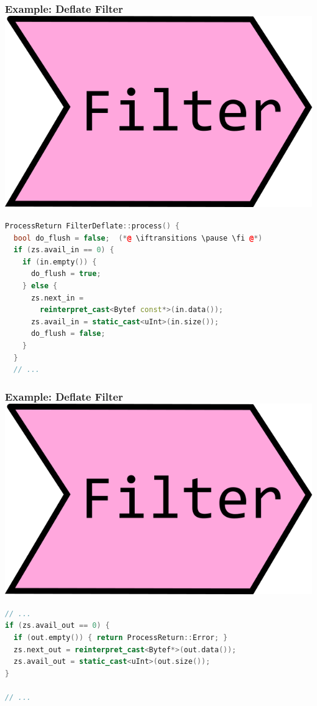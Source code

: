 \documentclass[aspectratio=169]{beamer}
\newif\iftransitions
\begin{document}
\begin{frame}[fragile]
  \frametitle{Example: Deflate Filter \hspace{233pt} \includegraphics[height=.1\textheight]{pipelinesgfx/filter.png}}
  
  \begin{lstlisting}[language={C++}]
ProcessReturn FilterDeflate::process() {
  bool do_flush = false;  (*@ \iftransitions \pause \fi @*)
  if (zs.avail_in == 0) {
    if (in.empty()) {
      do_flush = true;
    } else {
      zs.next_in =
        reinterpret_cast<Bytef const*>(in.data());
      zs.avail_in = static_cast<uInt>(in.size());
      do_flush = false;
    }
  }
  // ...
  \end{lstlisting}
\end{frame}

\begin{frame}[fragile]
  \frametitle{Example: Deflate Filter \hspace{233pt} \includegraphics[height=.1\textheight]{pipelinesgfx/filter.png}}
  
  \begin{lstlisting}[language={C++}]
// ...
if (zs.avail_out == 0) {
  if (out.empty()) { return ProcessReturn::Error; }
  zs.next_out = reinterpret_cast<Bytef*>(out.data());
  zs.avail_out = static_cast<uInt>(out.size());
}

// ...
  \end{lstlisting}
\end{frame}
\end{document}

